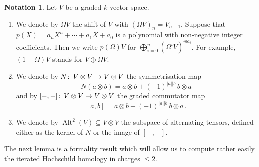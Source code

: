 \documentclass[oneside, a4paper, 12pt]{article}
\numberwithin{equation}{section}
\DeclareMathOperator{\Alt}{Alt}
\newcommand{\co}{\colon\thinspace}
\theoremstyle{plain}
\theoremstyle{definition}
\newtheorem{notation}[theorem]{Notation}
\theoremstyle{remark}
\begin{document}
\begin{notation}
Let $V$ be a graded $k$-vector space.
\begin{enumerate}
\item[(i)] We denote by $\Omega V$ the shift of $V$ with $(\Omega V)_{n}=V_{n+1}$. Suppose that $p(X)=a_n X^n + \cdots + a_1 X + a_0$ is a polynomial with non-negative integer coefficients. Then we write $p(\Omega) V$ for $\bigoplus_{i=0}^n (\Omega^{i} V)^{\oplus a_i}$. For example, $(1+\Omega) V$ stands for $V\oplus \Omega V$.
\item[(ii)] We denote by $N\co V\otimes V\to V\otimes V$ the symmetrisation map
\[
N(a\otimes b)=a\otimes b+(-1)^{|a||b|} b\otimes a
\]
and by $[-,-]\co V\otimes V\to V\otimes V$ the graded commutator map
\[
[a,b]=a\otimes b-(-1)^{|a||b|} b\otimes a\, .
\]
\item[(iii)] We denote by $\Alt^2(V)\subseteq V\otimes V$ the subspace of alternating tensors, defined either as the kernel of $N$ or the image of $[-,-]$.
\end{enumerate}
\end{notation}


The next lemma is a formality result which will allow us to compute rather easily the iterated Hochschild homology in charges $\leq 2$.
\end{document}
